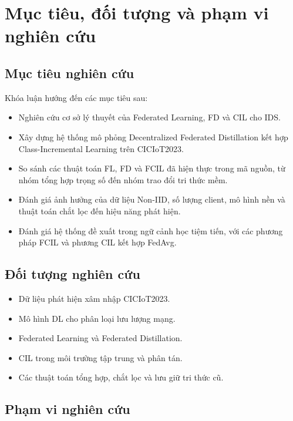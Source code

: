 \section{Mục tiêu, đối tượng và phạm vi nghiên cứu}

\subsection{Mục tiêu nghiên cứu}

Khóa luận hướng đến các mục tiêu sau:

\begin{itemize}
    \item Nghiên cứu cơ sở lý thuyết của Federated Learning, FD và CIL cho IDS.
    \item Xây dựng hệ thống mô phỏng Decentralized Federated Distillation kết hợp Class-Incremental Learning trên CICIoT2023.
    \item So sánh các thuật toán FL, FD và FCIL đã hiện thực trong mã nguồn, từ nhóm tổng hợp trọng số đến nhóm trao đổi tri thức mềm.
    \item Đánh giá ảnh hưởng của dữ liệu Non-IID, số lượng client, mô hình nền và thuật toán chắt lọc đến hiệu năng phát hiện.
    \item Đánh giá hệ thống đề xuất trong ngữ cảnh học tiệm tiến, với các phương pháp FCIL và phương CIL kết hợp FedAvg.
\end{itemize}

\subsection{Đối tượng nghiên cứu}

\begin{itemize}
    \item Dữ liệu phát hiện xâm nhập CICIoT2023.
    \item Mô hình DL cho phân loại lưu lượng mạng.
    \item Federated Learning và Federated Distillation.
    \item CIL trong môi trường tập trung và phân tán.
    \item Các thuật toán tổng hợp, chắt lọc và lưu giữ tri thức cũ.
\end{itemize}

\subsection{Phạm vi nghiên cứu}

